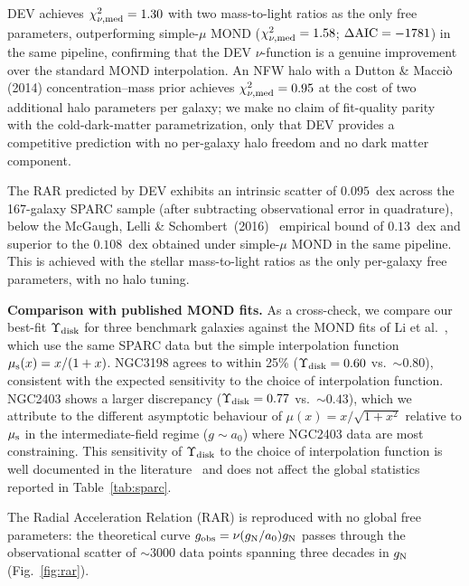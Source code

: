 \documentclass[aps,prd,twocolumn,showpacs,superscriptaddress]{revtex4-2}
\newcommand{\aO}{a_0}
\newcommand{\gN}{g_{\rm N}}
\newcommand{\gobs}{g_{\rm obs}}
\begin{document}
DEV achieves $\chi^2_{\nu,\rm med} = 1.30$ with two
mass-to-light ratios as the only free parameters,
outperforming simple-$\mu$ MOND ($\chi^2_{\nu,\rm med} = 1.58$;
$\Delta{\rm AIC} = -1781$) in the same pipeline, confirming
that the DEV $\nu$-function is a genuine improvement over the
standard MOND interpolation. An NFW halo with a Dutton \&
Macci\`o (2014) concentration--mass prior achieves
$\chi^2_{\nu,\rm med} = 0.95$ at the cost of two additional
halo parameters per galaxy; we make no claim of fit-quality
parity with the cold-dark-matter parametrization, only that
DEV provides a competitive prediction with no per-galaxy halo
freedom and no dark matter component.

The RAR predicted by DEV exhibits an intrinsic scatter of
$0.095$~dex across the 167-galaxy SPARC sample (after
subtracting observational error in quadrature), below the
McGaugh, Lelli \& Schombert~(2016)~\cite{McGaugh2016}
empirical bound of $0.13$~dex and superior to the $0.108$~dex
obtained under simple-$\mu$ MOND in the same pipeline. This
is achieved with the stellar mass-to-light ratios as the only
per-galaxy free parameters, with no halo tuning.

\textbf{Comparison with published MOND fits.}
As a cross-check, we compare our best-fit $\Upsilon_{\rm disk}$ for
three benchmark galaxies against the MOND fits of Li et al.~\cite{Li2018},
which use the same SPARC data but the simple interpolation function
$\mu_{\rm s}(x) = x/(1+x)$.
NGC3198 agrees to within 25\% ($\Upsilon_{\rm disk} = 0.60$ vs.\
$\sim\!0.80$), consistent with the expected sensitivity to the
choice of interpolation function.
NGC2403 shows a larger discrepancy ($\Upsilon_{\rm disk} = 0.77$
vs.\ $\sim\!0.43$), which we attribute to the different asymptotic
behaviour of $\mu(x) = x/\sqrt{1+x^2}$ relative to $\mu_{\rm s}$
in the intermediate-field regime ($g \sim \aO$) where NGC2403 data
are most constraining.
This sensitivity of $\Upsilon_{\rm disk}$ to the choice of
interpolation function is well documented in the
literature~\cite{Lelli2017,Li2018} and does not affect
the global statistics reported in Table~\ref{tab:sparc}.

The Radial Acceleration Relation (RAR) is reproduced with
no global free parameters: the theoretical curve $\gobs = \nu(\gN/\aO)\gN$
passes through the observational scatter of $\sim 3000$ data points
spanning three decades in $\gN$ (Fig.~\ref{fig:rar}).
\end{document}
